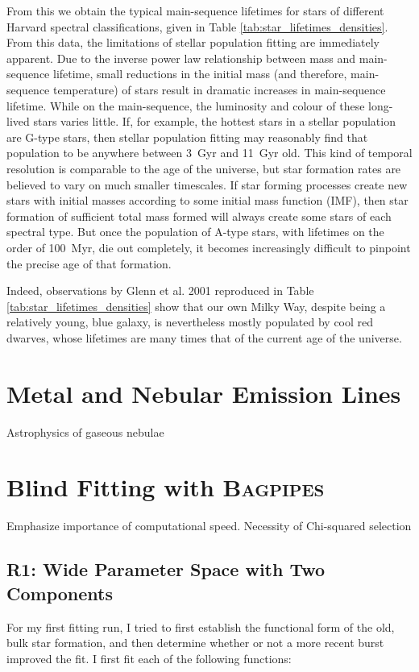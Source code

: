 \documentclass[a4paper,11pt]{article}
\begin{document}
\noindent From this we obtain the typical main-sequence lifetimes for stars of different Harvard spectral classifications, given in Table \ref{tab:star_lifetimes_densities}. From this data, the limitations of stellar population fitting are immediately apparent. Due to the inverse power law relationship between mass and main-sequence lifetime, small reductions in the initial mass (and therefore, main-sequence temperature) of stars result in dramatic increases in main-sequence lifetime. While on the main-sequence, the luminosity and colour of these long-lived stars varies little.\cite{Prialnik_2010} If, for example, the hottest stars in a stellar population are G-type stars, then stellar population fitting may reasonably find that population to be anywhere between \SI{3}{Gyr} and \SI{11}{Gyr} old. This kind of temporal resolution is comparable to the age of the universe, but star formation rates are believed to vary on much smaller timescales.\cite{Kauffmann_2003c} If star forming processes create new stars with initial masses according to some initial mass function (IMF), then star formation of sufficient total mass formed will always create some stars of each spectral type. But once the population of A-type stars, with lifetimes on the order of \SI{100}{Myr}, die out completely, it becomes increasingly difficult to pinpoint the precise age of that formation.

Indeed, observations by Glenn et al. 2001 reproduced in Table \ref{tab:star_lifetimes_densities} show that our own Milky Way, despite being a relatively young, blue galaxy, is nevertheless mostly populated by cool red dwarves, whose lifetimes are many times that of the current age of the universe.

\section{Metal and Nebular Emission Lines}

Astrophysics of gaseous nebulae

\section{Blind Fitting with \textsc{Bagpipes}}\label{sec:blind_fitting}
Emphasize importance of computational speed. Necessity of Chi-squared selection
\subsection{R1: Wide Parameter Space with Two Components}\label{sec:r1}
For my first fitting run, I tried to first establish the functional form of the
old, bulk star formation, and then determine whether or not a more recent burst
improved the fit. I first fit each of the following functions:
\end{document}
